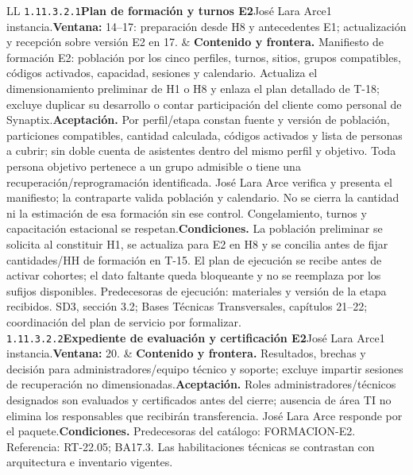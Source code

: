 \begin{longtable}{L{\tabcolsep\relax}L{\tabcolsep\relax}}
\texttt{1.\allowbreak{}11.\allowbreak{}3.\allowbreak{}2.\allowbreak{}1}\newline{}\textbf{Plan de formación y turnos E2}\newline{}José Lara Arce\newline{}1 instancia.\newline{}\textbf{Ventana:} 14--17: preparación desde H8 y antecedentes E1; actualización y recepción sobre versión E2 en 17. & \textbf{Contenido y frontera.} Manifiesto de formación E2: población por los cinco perfiles, turnos, sitios, grupos compatibles, códigos activados, capacidad, sesiones y calendario. Actualiza el dimensionamiento preliminar de H1 o H8 y enlaza el plan detallado de T-18; excluye duplicar su desarrollo o contar participación del cliente como personal de Synaptix.\newline{}\textbf{Aceptación.} Por perfil/etapa constan fuente y versión de población, particiones compatibles, cantidad calculada, códigos activados y lista de personas a cubrir; sin doble cuenta de asistentes dentro del mismo perfil y objetivo. Toda persona objetivo pertenece a un grupo admisible o tiene una recuperación/reprogramación identificada. José Lara Arce verifica y presenta el manifiesto; la contraparte valida población y calendario. No se cierra la cantidad ni la estimación de esa formación sin ese control. Congelamiento, turnos y capacitación estacional se respetan.\newline{}\textbf{Condiciones.} La población preliminar se solicita al constituir H1, se actualiza para E2 en H8 y se concilia antes de fijar cantidades/HH de formación en T-15. El plan de ejecución se recibe antes de activar cohortes; el dato faltante queda bloqueante y no se reemplaza por los sufijos disponibles. Predecesoras de ejecución: materiales y versión de la etapa recibidos. SD3, sección 3.2; Bases Técnicas Transversales, capítulos 21--22; coordinación del plan de servicio por formalizar.\\\hline
\texttt{1.\allowbreak{}11.\allowbreak{}3.\allowbreak{}2.\allowbreak{}2}\newline{}\textbf{Expediente de evaluación y certificación E2}\newline{}José Lara Arce\newline{}1 instancia.\newline{}\textbf{Ventana:} 20. & \textbf{Contenido y frontera.} Resultados, brechas y decisión para administradores/equipo técnico y soporte; excluye impartir sesiones de recuperación no dimensionadas.\newline{}\textbf{Aceptación.} Roles administradores/técnicos designados son evaluados y certificados antes del cierre; ausencia de área TI no elimina los responsables que recibirán transferencia. José Lara Arce responde por el paquete.\newline{}\textbf{Condiciones.} Predecesoras del catálogo: FORMACION-E2. Referencia: RT-22.05; BA17.3. Las habilitaciones técnicas se contrastan con arquitectura e inventario vigentes.\\\hline

\end{longtable}
